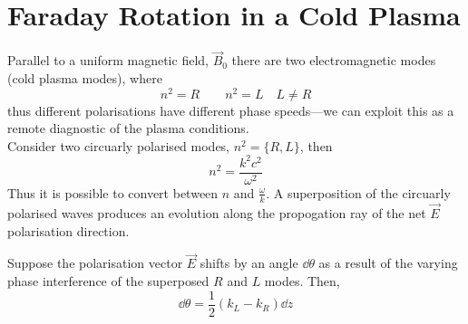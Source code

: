 \documentclass{book}         		                %
\begin{document}
\section{Faraday Rotation in a Cold Plasma}
\label{sec:faraday}

Parallel to a uniform magnetic field, $\vec{B}_0$ there are two
electromagnetic modes (cold plasma modes), where
\[ n^2 = R \qquad n^2 = L \quad L \neq R\] thus different
polarisations have different phase speeds---we can exploit this as a
remote diagnostic of the plasma conditions.\\
Consider two circuarly polarised modes, $n^2 = \{R, L \}$, then
\[ n^2 = \frac{k^2 c^2}{\omega^2} \] Thus it is possible to convert
between $n$ and $\frac{\omega}{k}$. A superposition of the circuarly
polarised waves produces an evolution along the propogation ray of the
net $\vec{E}$ polarisation direction.



Suppose the polarisation vector $\vec{E}$ shifts by an angle
$\dd{\theta}$ as a result of the varying phase interference of the
superposed $R$ and $L$ modes. Then,
\[ \dd{\theta} = \frac{1}{2} (k_L - k_R) \dd{z} \]
\end{document}
